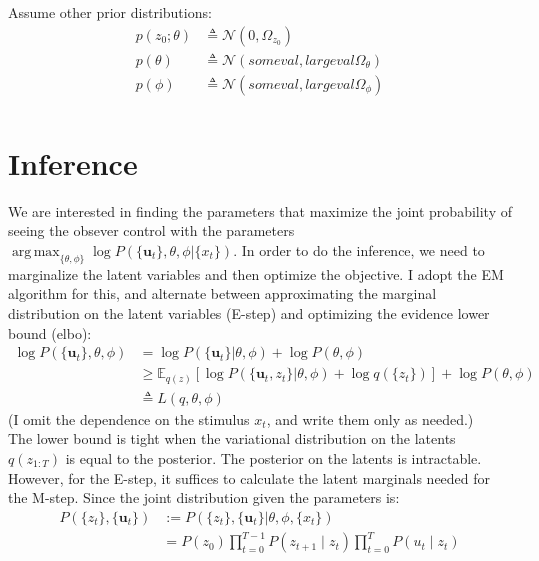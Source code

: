 \documentclass[11pt, reqno]{article}
\DeclareMathOperator*{\argmax}{arg\,max}
\numberwithin{equation}{section}
\begin{document}
Assume other prior distributions:
\begin{align*}
p(z_0; \theta) &\triangleq \mathcal{N}(0, \Omega_{z_0})\\
p(\theta) &\triangleq \mathcal{N}( someval, largeval \Omega_\theta)\\
p(\phi) &\triangleq \mathcal{N}( someval, largeval \Omega_\phi)\\
\end{align*}

\section{Inference}
\noindent We are interested in finding the parameters that maximize the joint probability of seeing the obsever control with the parameters $ \argmax_{\{\theta, \phi\}} \log P(\{\bm{u}_t\}, \theta, \phi | \{x_t\})$. In order to do the inference, we need to marginalize the latent variables and then optimize the objective. I adopt the EM algorithm for this, and alternate between approximating the marginal distribution on the latent variables (E-step) and optimizing the evidence lower bound (elbo): 
\begin{align*}
\log P(\{\bm{u}_t\}, \theta, \phi) &= \log P(\{\bm{u}_t\} | \theta, \phi) + \log P(\theta, \phi)   \\
&\geq \mathbb{E}_{q(z)} \left[ \log P(\{\bm{u}_t, z_t\}|\theta, \phi)  + \log q(\{z_t\}) \right]+ \log P(\theta, \phi) \\
& \triangleq L(q,\theta,\phi)
\end{align*}
(I omit the dependence on the stimulus $x_t$, and write them only as needed.) \\

The lower bound is tight when the variational distribution on the latents $q(z_{1:T})$ is equal to the posterior. The posterior on the latents is intractable. However, for the E-step, it suffices to calculate the latent marginals needed for the M-step. Since the joint distribution given the parameters is:
\begin{align*}
P(\{z_t\}, \{\bm{u}_t\}) & := P(\{z_t\}, \{\bm{u}_t\}|\theta, \phi, \{x_t\}) \\
&= P(z_0) \prod_{t=0}^{T-1} P(z_{t+1} \mid z_t) \prod_{t=0}^T P(u_t \mid z_t)
\end{align*}
\end{document}
